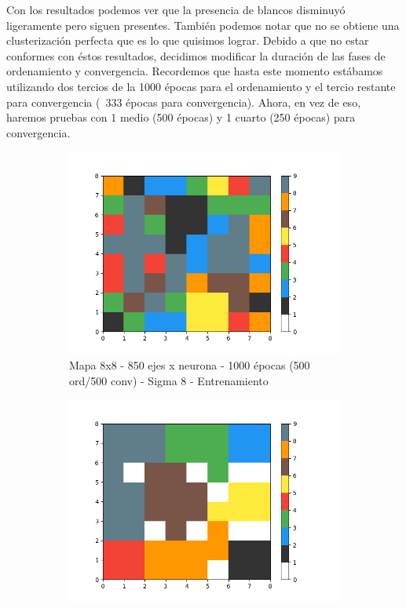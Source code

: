 Con los resultados podemos ver que la presencia de blancos disminuyó ligeramente pero siguen presentes. También podemos notar que no se obtiene una clusterización perfecta que es lo que quisimos lograr. Debido a que no estar conformes con éstos resultados, decidimos modificar la duración de las fases de ordenamiento y convergencia. Recordemos que hasta este momento estábamos utilizando dos tercios de la 1000 épocas para el ordenamiento y el tercio restante para convergencia (~333 épocas para convergencia). Ahora, en vez de eso, haremos pruebas con 1 medio (500 épocas) y 1 cuarto (250 épocas) para convergencia.

\newpage

\begin{figure}[!htbp]
\centering
\begin{subfigure}{.5\textwidth}
  \centering
  \includegraphics[width=1\linewidth, scale=1]{../img/map8x8_1000ep_850en_sigma8_faseord500.png}
  \caption{Mapa 8x8 - 850 ejes x neurona - 1000 épocas (500 ord/500 conv) - Sigma 8 - Entrenamiento}
  \label{fig:sub1}
\end{subfigure}%
\begin{subfigure}{.5\textwidth}
  \centering
  \includegraphics[width=1\linewidth, scale=1]{../img/map8x8_1000ep_850en_sigma8_faseord750.png}

\end{subfigure}
\end{figure}
